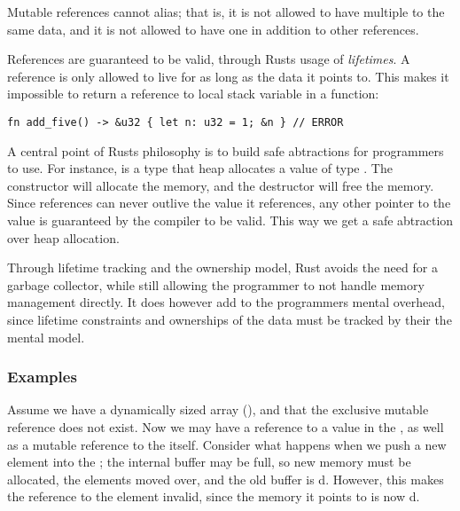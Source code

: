 \documentclass[a4paper,twoside]{article}
\begin{document}
Mutable references cannot alias; that is, it is not allowed to have multiple 
to the same data, and it is not allowed to have one  in addition to other
references.

References are guaranteed to be valid, through Rusts usage of \emph{lifetimes}.
A reference is only allowed to live for as long as the data it points to.
This makes it impossible to return a reference to local stack variable in a function:
\begin{lstlisting}[firstnumber=last]
fn add_five() -> &u32 { let n: u32 = 1; &n } // ERROR
\end{lstlisting}

A central point of Rusts philosophy is to build safe abtractions for programmers to use.
For instance,  is a type that heap allocates a value of type .
The constructor will allocate the memory, and the destructor will free the memory.
Since references can never outlive the value it references, any other pointer to the value
is guaranteed by the compiler to be valid.
This way we get a safe abtraction over heap allocation.

Through lifetime tracking and the ownership model, Rust avoids the need for a
garbage collector, while still allowing the programmer to not handle memory
management directly. It does however add to the programmers mental overhead,
since lifetime constraints and ownerships of the data must be tracked by their
the mental model.



\subsubsection{Examples}


Assume we have a dynamically sized array (), and that the exclusive
mutable reference does not exist. Now we may have a reference to a value
in the , as well as a mutable reference to the  itself.
Consider what happens when we push a new element into the ;
the internal buffer may be full, so new memory must be allocated,
the elements moved over, and the old buffer is d.
However, this makes the reference to the element invalid, since the memory
it points to is now d.
\end{document}
